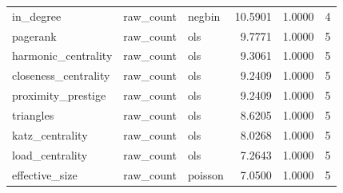 \begin{table}[htbp]
\begin{tabular}{lllrrc}
in\_degree & raw\_count & negbin & 10.5901 & 1.0000 & 4 \\
pagerank & raw\_count & ols & 9.7771 & 1.0000 & 5 \\
harmonic\_centrality & raw\_count & ols & 9.3061 & 1.0000 & 5 \\
closeness\_centrality & raw\_count & ols & 9.2409 & 1.0000 & 5 \\
proximity\_prestige & raw\_count & ols & 9.2409 & 1.0000 & 5 \\
triangles & raw\_count & ols & 8.6205 & 1.0000 & 5 \\
katz\_centrality & raw\_count & ols & 8.0268 & 1.0000 & 5 \\
load\_centrality & raw\_count & ols & 7.2643 & 1.0000 & 5 \\
effective\_size & raw\_count & poisson & 7.0500 & 1.0000 & 5 \\
\bottomrule
\end{tabular}
\end{table}
